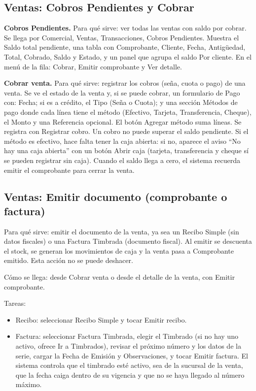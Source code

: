 \subsection{Ventas: Cobros Pendientes y Cobrar}
\label{sec:mu-ventas-cobros}

\textbf{Cobros Pendientes.} Para qué sirve: ver todas las ventas con saldo por cobrar. Se llega por Comercial, Ventas, Transacciones, Cobros Pendientes. Muestra el Saldo total pendiente, una tabla con Comprobante, Cliente, Fecha, Antigüedad, Total, Cobrado, Saldo y Estado, y un panel que agrupa el saldo Por cliente. En el menú de la fila: Cobrar, Emitir comprobante y Ver detalle.

\textbf{Cobrar venta.} Para qué sirve: registrar los cobros (seña, cuota o pago) de una venta. Se ve el estado de la venta y, si se puede cobrar, un formulario de Pago con: Fecha; si es a crédito, el Tipo (Seña o Cuota); y una sección Métodos de pago donde cada línea tiene el método (Efectivo, Tarjeta, Transferencia, Cheque), el Monto y una Referencia opcional. El botón Agregar método suma líneas. Se registra con Registrar cobro. Un cobro no puede superar el saldo pendiente. Si el método es efectivo, hace falta tener la caja abierta: si no, aparece el aviso ``No hay una caja abierta'' con un botón Abrir caja (tarjeta, transferencia y cheque sí se pueden registrar sin caja). Cuando el saldo llega a cero, el sistema recuerda emitir el comprobante para cerrar la venta.

\subsection{Ventas: Emitir documento (comprobante o factura)}
\label{sec:mu-ventas-emitir}

Para qué sirve: emitir el documento de la venta, ya sea un Recibo Simple (sin datos fiscales) o una Factura Timbrada (documento fiscal). Al emitir se descuenta el stock, se generan los movimientos de caja y la venta pasa a Comprobante emitido. Esta acción no se puede deshacer.

Cómo se llega: desde Cobrar venta o desde el detalle de la venta, con Emitir comprobante.

Tareas:
\begin{itemize}
  \item Recibo: seleccionar Recibo Simple y tocar Emitir recibo.
  \item Factura: seleccionar Factura Timbrada, elegir el Timbrado (si no hay uno activo, ofrece Ir a Timbrados), revisar el próximo número y los datos de la serie, cargar la Fecha de Emisión y Observaciones, y tocar Emitir factura. El sistema controla que el timbrado esté activo, sea de la sucursal de la venta, que la fecha caiga dentro de su vigencia y que no se haya llegado al número máximo.
\end{itemize}

